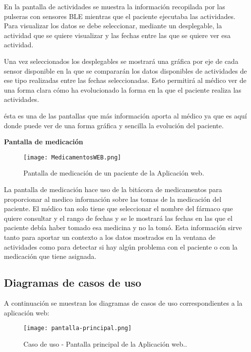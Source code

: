 \documentclass[11pt,spanish]{article}
\begin{document}
En la pantalla de actividades se muestra la información recopilada por las pulseras con sensores BLE mientras que el paciente ejecutaba las actividades. Para visualizar los datos se debe seleccionar, mediante un desplegable, la actividad que se quiere visualizar y las fechas entre las que se quiere ver esa actividad.
\newline

Una vez seleccionados los desplegables se mostrará una gráfica por eje de cada sensor disponible en la que se compararán los datos disponibles de actividades de ese tipo realizadas entre las fechas seleccionadas. Esto permitirá al médico ver de una forma clara cómo ha evolucionado la forma en la que el paciente realiza las actividades.
\newline

ésta es una de las pantallas que más información aporta al médico ya que es aquí donde puede ver de una forma gráfica y sencilla la evolución del paciente.
\newline
\newpage

\textbf{Pantalla de medicación}
\newline

\begin{figure}[H]
  \centering
  \texttt{[image: MedicamentosWEB.png]}
  \caption{Pantalla de medicación de un paciente de la Aplicación web.}
\end{figure}

La pantalla de medicación hace uso de la bitácora de medicamentos para proporcionar al medico información sobre las tomas de la medicación del paciente. El médico tan solo tiene que seleccionar el nombre del fármaco que quiere consultar y el rango de fechas y se le mostrará las fechas en las que el paciente debía haber tomado esa medicina y no la tomó. Esta información sirve tanto para aportar un contexto a los datos mostrados en la ventana de actividades como para detectar si hay algún problema con el paciente o con la medicación que tiene asignada.

\subsection{Diagramas de casos de uso}

A continuación se muestran los diagramas de casos de uso correspondientes a la aplicación web:
\newline

\begin{figure}[H]
  \centering
  \texttt{[image: pantalla-principal.png]}
  \caption{Caso de uso - Pantalla principal de la Aplicación web..}
\end{figure}
\end{document}
